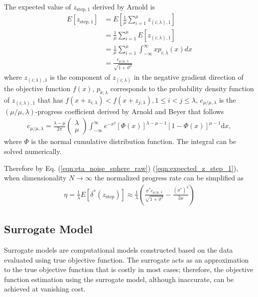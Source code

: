 The expected value of $z_{\text{step},1}$ derived by Arnold \cite{ARNOLD2001127} is
\begin{align}\label{eqn:expected_z_step_1}{}
E \left[ z_{\text{step},1} \right] 
&= E[\frac{1}{\mu}\sum_{i=1}^\mu z_{(i;\lambda),1}] \nonumber\\
&= \frac{1}{\mu} \sum_{i=1}^\mu E [ z_{(i; \lambda),1} ] \nonumber\\
&=  \frac{1}{\mu} \sum_{i=1}^\mu \int_{-\infty}^\infty x p_{i;\lambda}(x)dx \nonumber\\
& = \frac{c_{\mu/\mu,\lambda}}{\sqrt{1+ \vartheta^2}}
\end{align}
where $z_{(i;\lambda),1}$ is the component of $z_{(i;\lambda)}$ in the negative gradient direction of the objective function $f(x)$, $p_{k;\lambda}$ corresponds to the probability density function of $z_{(i;\lambda),1}$ that has $f(x+z_{i;\lambda})<f(x+z_{j;\lambda}), 1 \leq i<j \leq \lambda$, $c_{\mu/\mu,\lambda}$ is the $(\mu/\mu,\lambda)$-progress coefficient derived by Arnold and Beyer \cite{Arnold:2000:EMS:645825.669117} that follows
\begin{align}\label{eqn:c_mu_mu_lambda}
c_{\mu/\mu,\lambda}  = \frac{\lambda-\mu}{2 \pi} \begin{pmatrix} \lambda \\ \mu \end{pmatrix} \int_{-\infty}^{\infty} e^{-x^2}   \left [ \Phi(x)\right]^{\lambda-\mu-1}  \left[ 1- \Phi (x) \right]^{\mu-1}  \text{d} x,
\end{align}
where $\Phi$ is the normal cumulative distribution function. The integral can be solved numerically.  

Therefore by Eq. (\ref{eqn:eta_noise_sphere_raw}) (\ref{eqn:expected_z_step_1}), when dimensionality $N \rightarrow \infty$ the normalized progress rate can be simplified as
\begin{align}{}\label{eqn:eta_noise_sphere}{}
\eta = \frac{1}{\lambda}E[ \delta^*(z_{\text{step}})] \approx \frac{1}{\lambda} \left( \frac{\sigma^* c_{\mu / \mu, \lambda}}{\sqrt {1+ \vartheta^2}} - \frac{(\sigma^*)^2}{2 \mu} \right)
\end{align}



\subsection{Surrogate Model} \label{ssec:surrogate_model}

Surrogate models are computational models constructed based on the data evaluated using true objective function. The surrogate acts as an approximation to the true objective function that is costly in most cases; therefore, the objective function estimation using the surrogate model, although inaccurate, can be achieved at vanishing cost. 

